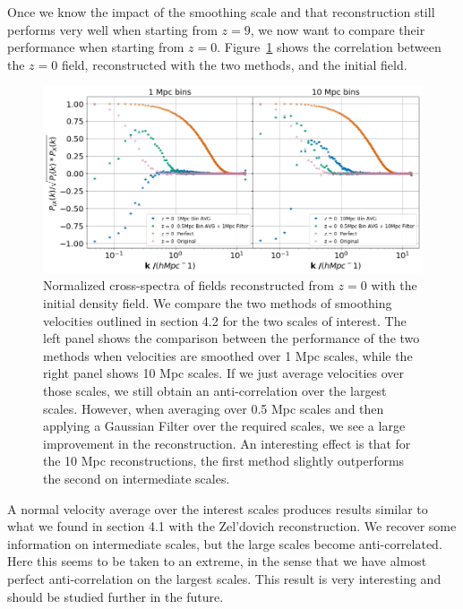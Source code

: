 Once we know the impact of the smoothing scale and that reconstruction still performs very well when starting from $z=9$, we now want to compare their performance when starting from $z=0$. Figure~\ref{fig:4.3} shows the correlation between the $z=0$ field, reconstructed with the two methods, and the initial field. 

\begin{figure}
    \centering
    \includegraphics[width=1\columnwidth]{images/realRecon/filterComp.png}%
    
    \caption{
        Normalized cross-spectra of fields reconstructed from $z=0$ with the initial density field. We compare the two methods of smoothing velocities outlined in section 4.2 for the two scales of interest. The left panel shows the comparison between the performance of the two methods when velocities are smoothed over 1 Mpc scales, while the right panel shows 10 Mpc scales. If we just average velocities over those scales, we still obtain an anti-correlation over the largest scales. However, when averaging over 0.5 Mpc scales and then applying a Gaussian Filter over the required scales, we see a large improvement in the reconstruction. An interesting effect is that for the 10 Mpc reconstructions, the first method slightly outperforms the second on intermediate scales. 
    }
    
    \label{fig:4.3}
\end{figure}

A normal velocity average over the interest scales produces results similar to what we found in section 4.1 with the Zel'dovich reconstruction. We recover some information on intermediate scales, but the large scales become anti-correlated. Here this seems to be taken to an extreme, in the sense that we have almost perfect anti-correlation on the largest scales. This result is very interesting and should be studied further in the future.


